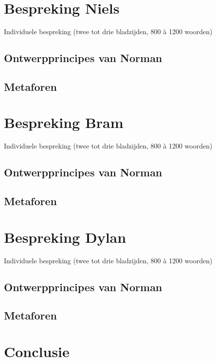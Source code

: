 \documentclass[11pt]{article}
\begin{document}
\section{Bespreking Niels}
Individuele bespreking (twee tot drie bladzijden, 800 à 1200 woorden)
\subsection{Ontwerpprincipes van Norman}
\subsection{Metaforen}
\newpage

\section{Bespreking Bram}
Individuele bespreking (twee tot drie bladzijden, 800 à 1200 woorden)
\subsection{Ontwerpprincipes van Norman}
\subsection{Metaforen}
\newpage

\section{Bespreking Dylan}
Individuele bespreking (twee tot drie bladzijden, 800 à 1200 woorden)
\subsection{Ontwerpprincipes van Norman}
\subsection{Metaforen}
\newpage


\section{Conclusie}

\newpage
\end{document}

